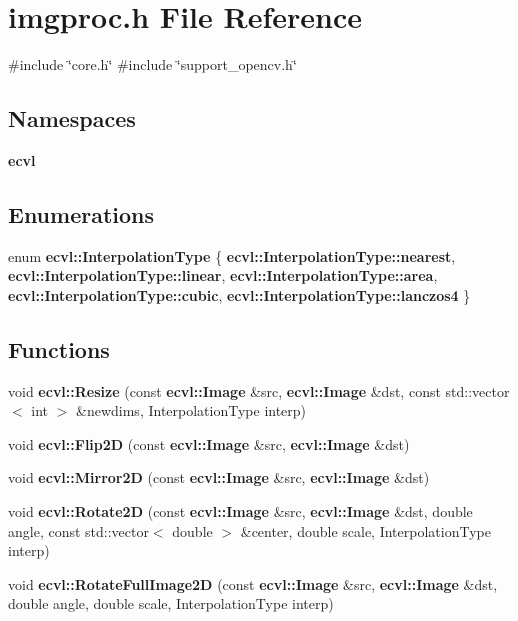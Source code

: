 \section{imgproc.\+h File Reference}
\label{imgproc_8h}
{\ttfamily \#include \char`\"{}core.\+h\char`\"{}}\newline
{\ttfamily \#include \char`\"{}support\+\_\+opencv.\+h\char`\"{}}\newline
\subsection*{Namespaces}
\begin{DoxyCompactItemize}
\item 
 \textbf{ ecvl}
\end{DoxyCompactItemize}
\subsection*{Enumerations}
\begin{DoxyCompactItemize}
\item 
enum \textbf{ ecvl\+::\+Interpolation\+Type} \{ \newline
\textbf{ ecvl\+::\+Interpolation\+Type\+::nearest}, 
\textbf{ ecvl\+::\+Interpolation\+Type\+::linear}, 
\textbf{ ecvl\+::\+Interpolation\+Type\+::area}, 
\textbf{ ecvl\+::\+Interpolation\+Type\+::cubic}, 
\newline
\textbf{ ecvl\+::\+Interpolation\+Type\+::lanczos4}
 \}
\end{DoxyCompactItemize}
\subsection*{Functions}
\begin{DoxyCompactItemize}
\item 
void \textbf{ ecvl\+::\+Resize} (const \textbf{ ecvl\+::\+Image} \&src, \textbf{ ecvl\+::\+Image} \&dst, const std\+::vector$<$ int $>$ \&newdims, Interpolation\+Type interp)
\item 
void \textbf{ ecvl\+::\+Flip2D} (const \textbf{ ecvl\+::\+Image} \&src, \textbf{ ecvl\+::\+Image} \&dst)
\item 
void \textbf{ ecvl\+::\+Mirror2D} (const \textbf{ ecvl\+::\+Image} \&src, \textbf{ ecvl\+::\+Image} \&dst)
\item 
void \textbf{ ecvl\+::\+Rotate2D} (const \textbf{ ecvl\+::\+Image} \&src, \textbf{ ecvl\+::\+Image} \&dst, double angle, const std\+::vector$<$ double $>$ \&center, double scale, Interpolation\+Type interp)
\item 
void \textbf{ ecvl\+::\+Rotate\+Full\+Image2D} (const \textbf{ ecvl\+::\+Image} \&src, \textbf{ ecvl\+::\+Image} \&dst, double angle, double scale, Interpolation\+Type interp)
\end{DoxyCompactItemize}
